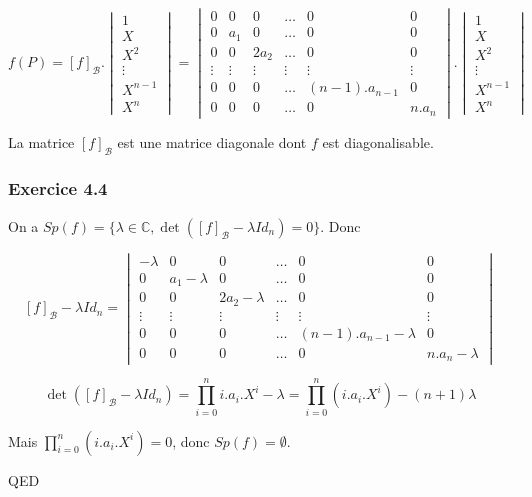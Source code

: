 \documentclass[]{book}
\theoremstyle{definition}
\newcommand{\bb}[1]{\mathbb{#1}}
\newcommand{\C}{\bb{C}}
\begin{document}
$$f(P) = [f]_{\mathscr{B}}. \begin{vmatrix} 1 \\ X \\ X^2 \\ \vdots \\ X^{n-1} \\ X^{n} \end{vmatrix} = \begin{vmatrix} 0 & 0 & 0 & \ldots & 0 & 0 \\ 0 & a_1 & 0 & \ldots & 0 & 0 \\ 0 & 0 & 2a_2 & \ldots & 0 & 0 \\ \vdots & \vdots & \vdots & \vdots & \vdots & \vdots \\ 0 & 0 & 0 & \ldots & (n-1).a_{n-1} & 0\\ 0 & 0 & 0 & \ldots & 0 & n.a_n  \end{vmatrix}.\begin{vmatrix} 1 \\ X \\ X^2 \\ \vdots \\ X^{n-1} \\ X^{n} \end{vmatrix}$$

La matrice $[f]_{\mathscr{B}}$ est une matrice diagonale dont $f$ est diagonalisable.

\subsubsection*{Exercice 4.4}
On a $Sp(f) = \{\lambda \in \C, \det([f]_{\mathscr{B}} -\lambda Id_n) = 0 \} $. Donc

$$[f]_{\mathscr{B}} -\lambda Id_n = \begin{vmatrix} -\lambda & 0 & 0 & \ldots & 0 & 0 \\ 0 & a_1-\lambda & 0 & \ldots & 0 & 0 \\ 0 & 0 & 2a_2-\lambda & \ldots & 0 & 0 \\ \vdots & \vdots & \vdots & \vdots & \vdots & \vdots \\ 0 & 0 & 0 & \ldots & (n-1).a_{n-1}-\lambda & 0\\ 0 & 0 & 0 & \ldots & 0 & n.a_n-\lambda  \end{vmatrix}$$

$$\det([f]_{\mathscr{B}} -\lambda Id_n) = \prod_{i=0}^{n} i.a_i.X^i-\lambda = \prod_{i=0}^{n}(i.a_i.X^i) -(n+1)\lambda$$ 

Mais $\prod_{i=0}^{n}(i.a_i.X^i) = 0$, donc $Sp(f) = \emptyset$. 

QED
\end{document}
